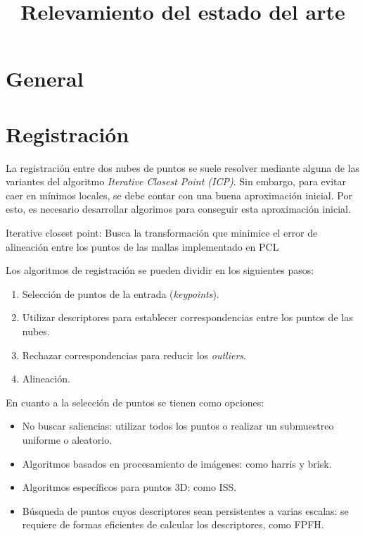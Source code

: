 \documentclass{pfc}
\title{Relevamiento del estado del arte}
\begin{document}
	\maketitle
	\section{General}

	\section{Registración}
		La registración entre dos nubes de puntos se suele resolver mediante
		alguna de las variantes del algoritmo \emph{Iterative Closest Point (ICP)}. 
		Sin embargo, para evitar caer en mínimos locales,
		se debe contar con una buena aproximación inicial.
		Por esto, es necesario desarrollar algorimos para conseguir esta
		aproximación inicial.

		Iterative closest point:
			Busca la transformación que minimice el error de alineación
			entre los puntos de las mallas
			implementado en PCL


		Los algoritmos de registración se pueden dividir en los siguientes pasos:
		\begin{enumerate}
			\item Selección de puntos de la entrada (\emph{keypoints}).
			\item Utilizar descriptores para establecer correspondencias entre los puntos de las nubes.
			\item Rechazar correspondencias para reducir los \emph{outliers}.
			\item Alineación.
		\end{enumerate}

		En cuanto a la selección de puntos se tienen como opciones:
		\begin{itemize}
			\item No buscar saliencias: utilizar todos los puntos o realizar un submuestreo uniforme o aleatorio.
			\item Algoritmos basados en procesamiento de imágenes: como harris y brisk.
			\item Algoritmos específicos para puntos 3D: como ISS.
			\item Búsqueda de puntos cuyos descriptores sean persistentes a varias escalas: se requiere de formas eficientes de calcular los descriptores, como FPFH.
		\end{itemize}
\end{document}
